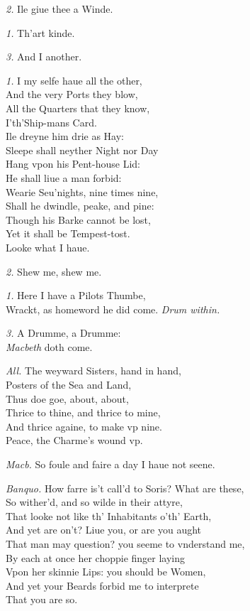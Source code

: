 \documentclass[12pt]{sides}
\newcommand{\dia}[1]{\hskip 10pt\textit{#1}\hskip 6pt}
\begin{document}
\begin{multicols}{2}
			\dia{2.} Ile giue thee a Winde.
			
			\dia{1.} Th'art kinde.
			
			\dia{3.} And I another.
			
			\dia{1.} I my selfe haue all the other, \\ And the very Ports they blow, \\ All the Quarters that they know, \\ I'th'Ship-mans Card. \\  Ile dreyne him drie as Hay: \\ Sleepe shall neyther Night nor Day \\ Hang vpon his Pent-house Lid: \\ He shall liue a man forbid: \\ Wearie Seu'nights, nine times nine, \\ Shall he dwindle, peake, and pine: \\ Though his Barke cannot be lost, \\ Yet it shall be Tempest-tost. \\ Looke what I haue.
            
            \dia{2.} Shew me, shew me.

            \dia{1.} Here I have a Pilots Thumbe, \\ Wrackt, as homeword he did come. \hfill\textit{Drum within.}
            
            \dia{3.} A Drumme, a Drumme: \\ \textit{Macbeth} doth come.

            \dia{All.} The weyward Sisters, hand in hand, \\ Posters of the Sea and Land, \\ Thus doe goe, about, about, \\ Thrice to thine, and thrice to mine, \\ And thrice againe, to make vp nine. \\ Peace, the Charme's wound vp.


            \dia{Macb.} So foule and faire a day I haue not seene.
            
            \dia{Banquo.} How farre is't call'd to Soris? What are these, \\ So wither'd, and so wilde in their attyre, \\ That looke not like th' Inhabitants o'th' Earth, \\ And yet are on't? Liue you, or are you aught \\ That man may question? you seeme to vnderstand me, \\ By each at once her choppie finger laying \\ Vpon her skinnie Lips: you should be Women, \\ And yet your Beards forbid me to interprete \\ That you are so.


\end{multicols}
\end{document}
